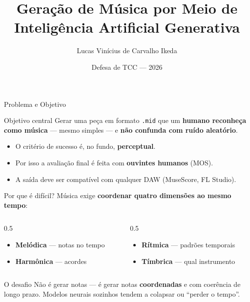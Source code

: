 \documentclass[aspectratio=169]{beamer}
\title[Geração de Música por IA]{Geração de Música por Meio de\\Inteligência Artificial Generativa}
\author[Lucas Ikeda]{Lucas Vinícius de Carvalho Ikeda}
\institute[UNESP]{Orientador: Prof.\ Dr.\ Danillo Roberto Pereira\\Faculdade de Ciências e Tecnologia --- UNESP}
\date{Defesa de TCC --- 2026}
\begin{document}
\begin{frame}
  \titlepage
\end{frame}

\begin{frame}{Problema e Objetivo}
  \begin{block}{Objetivo central}
    Gerar uma peça em formato \texttt{.mid} que um \textbf{humano reconheça como
    música} --- mesmo simples --- e \textbf{não confunda com ruído aleatório}.
  \end{block}
  \vspace{0.4em}
  \begin{itemize}
    \item O critério de sucesso é, no fundo, \textbf{perceptual}.
    \item Por isso a avaliação final é feita com \textbf{ouvintes humanos} (MOS).
    \item A saída deve ser compatível com qualquer DAW (MuseScore, FL Studio).
  \end{itemize}
\end{frame}

\begin{frame}{Por que é difícil?}
  Música exige \textbf{coordenar quatro dimensões ao mesmo tempo}:
  \begin{columns}[T]
    \begin{column}{0.5\textwidth}
      \begin{itemize}
        \item \textbf{Melódica} --- notas no tempo
        \item \textbf{Harmônica} --- acordes
      \end{itemize}
    \end{column}
    \begin{column}{0.5\textwidth}
      \begin{itemize}
        \item \textbf{Rítmica} --- padrões temporais
        \item \textbf{Tímbrica} --- qual instrumento
      \end{itemize}
    \end{column}
  \end{columns}
  \vspace{1em}
  \begin{alertblock}{O desafio}
    Não é gerar notas --- é gerar notas \textbf{coordenadas} e com coerência de
    longo prazo. Modelos neurais sozinhos tendem a colapsar ou ``perder o tempo''.
  \end{alertblock}
\end{frame}
\end{document}
